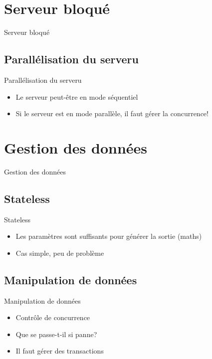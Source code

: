 \def\sectitle{Serveur bloqué}
\section{\sectitle}
\begin{frame}{\sectitle}
    \def\subsectitle{Parallélisation du serveru}
    \subsection{\subsectitle}
    \begin{block}{\subsectitle}
        \begin{itemize}
            \item Le serveur peut-être en mode séquentiel
            \item Si le serveur est en mode parallèle, il faut gérer la
                concurrence!
        \end{itemize}
    \end{block}
\end{frame}


\def\sectitle{Gestion des données}
\section{\sectitle}
\begin{frame}{\sectitle}
    \def\subsectitle{Stateless}
    \subsection{\subsectitle}
    \begin{block}{\subsectitle}
        \begin{itemize}
            \item Les paramètres sont suffisants pour générer la sortie (maths)
            \item Cas simple, peu de problème
        \end{itemize}
    \end{block}
    \def\subsectitle{Manipulation de données}
    \subsection{\subsectitle}
    \begin{block}{\subsectitle}
        \begin{itemize}
            \item Contrôle de concurrence
            \item Que se passe-t-il si panne?
            \item Il faut gérer des transactions
        \end{itemize}
    \end{block}
\end{frame}


